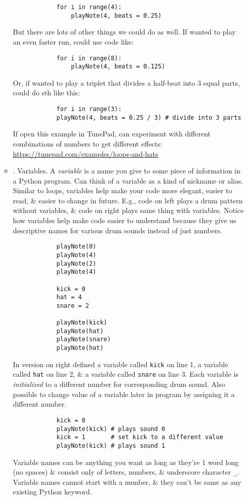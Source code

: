 \documentclass{article}
\begin{document}
\begin{itemize}
\begin{itemize}
\begin{verbatim}
			for i in range(4):
			    playNote(4, beats = 0.25)
		\end{verbatim}
		But there are lots of other things we could do as well. If wanted to play an even faster run, could use code like:
		\begin{verbatim}
			for i in range(8):
			    playNote(4, beats = 0.125)
		\end{verbatim}
		Or, if wanted to play a triplet that divides a half-beat into 3 equal parts, could do sth like this:
		\begin{verbatim}
			for i in range(3):
			playNote(4, beats = 0.25 / 3) # divide into 3 parts
		\end{verbatim}
		If open this example in TunePad, can experiment with different combinations of numbers to get different effects: \url{https://tunepad.com/examples/loops-and-hats}
		\item {. Variables.} A {\it variable} is a name you give to some piece of information in a Python program. Can think of a variable as a kind of nickname or alias. Similar to loops, variables help make your code more elegant, easier to read, \& easier to change in future. E.g., code on left plays a drum pattern without variables, \& code on right plays same thing with variables. Notice how variables help make code easier to understand because they give us descriptive names for various drum sounds instead of just numbers.
		\begin{verbatim}
			playNote(0)
			playNote(4)
			playNote(2)
			playNote(4)
			
			kick = 0
			hat = 4
			snare = 2
			
			playNote(kick)
			playNote(hat)
			playNote(snare)
			playNote(hat)
		\end{verbatim}
		In version on right defined a variable called {\tt kick} on line 1, a variable called {\tt hat} on line 2, \& a variable called {\tt snare} on line 3. Each variable is {\it initialized} to a different number for corresponding drum sound. Also possible to change value of a variable later in program by assigning it a different number.
		\begin{verbatim}
			kick = 0
			playNote(kick) # plays sound 0
			kick = 1       # set kick to a different value
			playNote(kick) # plays sound 1
		\end{verbatim}
		Variable names can be anything you want as long as they're 1 word long (no spaces) \& consist only of letters, numbers, \& underscore character \verb|_|. Variable names cannot start with a number, \& they can't be same as any existing Python keyword.
		

\end{itemize}
\end{itemize}
\end{document}
